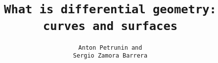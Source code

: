 \title{\tt What is differential geometry:\\
curves and surfaces}
\author{\tt Anton Petrunin and \\ \tt Sergio Zamora Barrera}
\date{}
\maketitle
\thispagestyle{empty}

